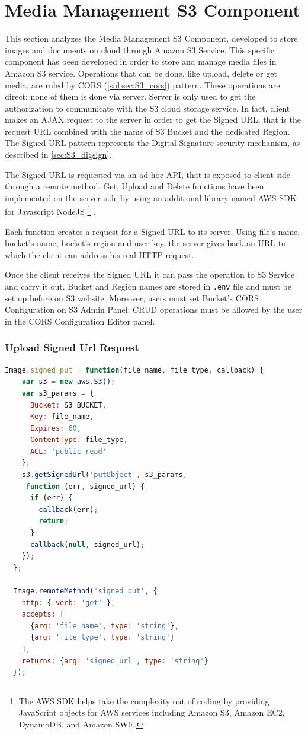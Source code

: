 \section{Media Management S3 Component}
\label{sec:S3_component}

This section analyzes the Media Management S3 Component, developed to store images and documents on cloud through Amazon S3 Service.
This specific component has been developed in order to store and manage media files in Amazon S3 service.
Operations that can be done, like upload, delete or get media, are ruled by CORS (\ref{subsec:S3_cors}) pattern.
These operations are direct: none of them is done via server. Server is only used to get the authorization to communicate with the S3 cloud storage service.
In fact, client makes an AJAX request to the server in order to get the Signed URL, that is the request URL combined with the name of S3 Bucket and the dedicated Region.
The Signed URL pattern represents the Digital Signature security mechanism, as described in \ref{sec:S3_digsign}.

The Signed URL is requested via an ad hoc API, that is exposed to client side through a remote method.
Get, Upload and Delete functions have been implemented on the server side by using an additional library named AWS SDK for Javascript NodeJS \footnote{ The AWS SDK helps take the complexity out of coding by providing JavaScript objects for AWS services including Amazon S3, Amazon EC2, DynamoDB, and Amazon SWF.} \cite{s3_aws_sdk}.

Each function creates a request for a Signed URL to its server.
Using file's name, bucket's name, bucket's region and user key, the server gives back an URL to which the client can address his real HTTP request.

Once the client receives the Signed URL it can pass the operation to S3 Service and carry it out.
Bucket and Region names are stored in \texttt{.env} file and must be set up before on S3 website.
Moreover, users must set Bucket's CORS Configuration on S3 Admin Panel: CRUD operations must be allowed by the user in the CORS Configuration Editor panel.


\subsubsection{Upload Signed Url Request}

\begin{lstlisting}[language=javascript]
Image.signed_put = function(file_name, file_type, callback) {
    var s3 = new aws.S3();
    var s3_params = {
      Bucket: S3_BUCKET,
      Key: file_name,
      Expires: 60,
      ContentType: file_type,
      ACL: 'public-read'
    };
    s3.getSignedUrl('putObject', s3_params,
     function (err, signed_url) {
      if (err) {
        callback(err);
        return;
      }
      callback(null, signed_url);
    });
  };

  Image.remoteMethod('signed_put', {
    http: { verb: 'get' },
    accepts: [
      {arg: 'file_name', type: 'string'},
      {arg: 'file_type', type: 'string'}
    ],
    returns: {arg: 'signed_url', type: 'string'}
  });
\end{lstlisting}

